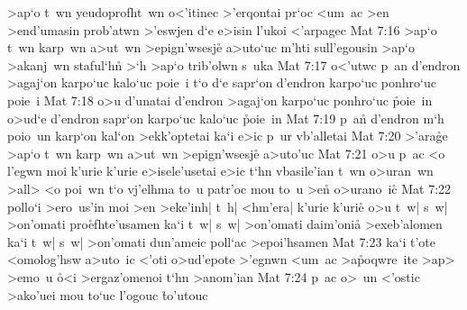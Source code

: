 >ap`o
t~wn
yeudoprofht~wn
o<'itinec
>'erqontai
pr`oc
<um~ac
>en
>end'umasin
prob'atwn
>'eswjen
d`e
e>isin
l'ukoi
<'arpagec\bibvsend
\vs Mat 7:16
>ap`o
t~wn
karp~wn
a>ut~wn
>epign'wsesj\r{e}
a>uto`uc
m'hti
sull'egousin
>ap`o
>akanj~wn
staful`h\r{n}
>`h
>ap`o
trib'olwn
s~uka\bibvsend
\vs Mat 7:17
o<'utwc
p~an
d'endron
>agaj`on
karpo`uc
kalo`uc
poie~i
t`o
d`e
sapr`on
d'endron
karpo`uc
ponhro`uc
poie~i\bibvsend
\vs Mat 7:18
o>u
d'unatai
d'endron
>agaj`on
karpo`uc
ponhro`uc
\r{p}oie~in
o>ud`e
d'endron
sapr`on
karpo`uc
kalo`uc
\r{p}oie~in\bibvsend
{}
\vs Mat 7:19
p~a\r{n}
d'endron
m`h
poio~un
karp`on
kal`on
>ekk'optetai
ka`i
e>ic
p~ur
vb'alletai\bibvsend
\vs Mat 7:20
>'ara\r{g}e
>ap`o
t~wn
karp~wn
a>ut~wn
>epign'wsesj\r{e}
a>uto'uc\bibvsend
\vs Mat 7:21
o>u
p~ac
<o
l'egwn
moi
k'urie
k'urie
e>isele'usetai
e>ic
t`hn
vbasile'ian
t~wn
o>uran~wn
>all>
<o
poi~wn
t`o
vj'elhma
to~u
patr'oc
mou
to~u
>e\r{n}
o>urano~i\r{c}\bibvsend
{}
\vs Mat 7:22
pollo`i
>ero~us'in
moi
>en
>eke'inh|
t~h|
<hm'era|
k'urie
k'uri\r{e}
o>u
t~w|
s~w|
>on'omati
pro\r{e}fhte'usamen
ka`i
t~w|
s~w|
>on'omati
daim'oni\r{a}
>exeb'alomen
ka`i
t~w|
s~w|
>on'omati
dun'ameic
poll`ac
>epoi'hsamen\bibvsend
\vs Mat 7:23
ka`i
t'ote
<omolog'hsw
a>uto~ic
<'oti
o>ud'epote
>'egnwn
<um~ac
>a\r{p}oqwre~ite
>ap>
>emo~u
\r{o}<i
>ergaz'omenoi
t`hn
>anom'ian\bibvsend
\vs Mat 7:24
p~ac
o>~un
<'ostic
>ako'uei
mou
to`uc
l'ogouc
\r{t}o'utouc

